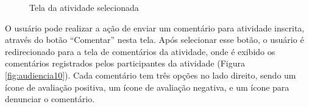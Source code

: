 \begin{figure}[H]
    \centering
    \caption{Tela da atividade selecionada}
    \label{fig:audiencia9}
\end{figure}

O usuário pode realizar a ação de enviar um comentário para atividade inscrita, através do botão “Comentar” nesta tela. Após selecionar esse botão, o usuário é redirecionado para a tela de comentários da atividade, onde é exibido os comentários registrados pelos participantes da atividade (Figura \ref{fig:audiencia10}). Cada comentário tem três opções no lado direito, sendo um ícone de avaliação positiva, um ícone de avaliação negativa, e um ícone para denunciar o comentário.

